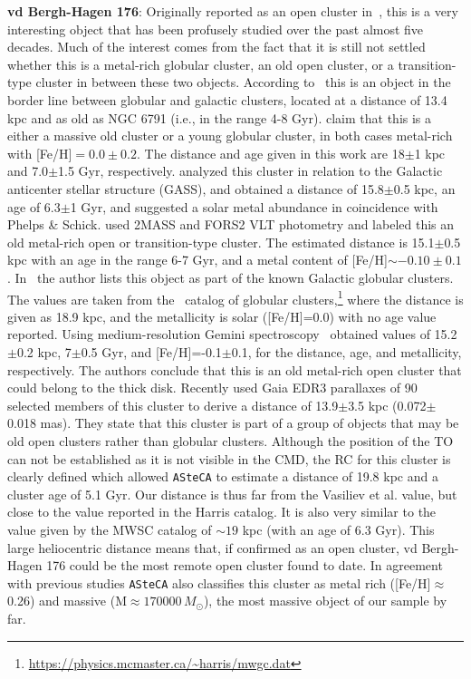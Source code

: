 \documentclass{aa}
\begin{document}
  \textbf{vd Bergh-Hagen 176}: Originally reported as an open cluster
  in~\cite{vandenBergh_1975}, this is a very interesting object that has been
  profusely studied over the past almost five decades. Much of the interest
  comes from the fact that it is still not settled whether this is a metal-rich
  globular cluster, an old open cluster, or a transition-type cluster in between
  these two objects.
  According to~\cite{Ortolani_1995} this is an object in the border line
  between globular and galactic clusters, located at a distance of 13.4 kpc
  and as old as NGC 6791 (i.e., in the range 4-8 Gyr).
  \cite{Phelps_2003} claim that this is a either a massive old cluster or a
  young globular cluster, in both cases metal-rich with [Fe/H]$=0.0\pm0.2$.
  The distance and age given in this work are 18$\pm$1 kpc and 7.0$\pm$1.5 Gyr,
  respectively.
  \cite{Frinchaboy_2006} analyzed this cluster in relation to the Galactic
  anticenter stellar structure (GASS), and obtained a distance of 15.8$\pm$0.5
  kpc, an age of 6.3$\pm$1 Gyr, and suggested a solar metal abundance in
  coincidence with Phelps \& Schick.
  \cite{Davoust_2011} used 2MASS and FORS2 VLT photometry and labeled this an
  old metal-rich open or transition-type cluster. The estimated  distance is
  15.1$\pm$0.5 kpc with an age in the range 6-7 Gyr, and a metal content of
  [Fe/H]$\sim-0.10\pm0.1$.
  In~\cite{vandenBergh_2011} the author lists this object as part of the known
  Galactic globular clusters. The values are taken from
  the~\cite{Harris_1996,Harris_2010} catalog of globular
  clusters,\footnote{\url{https://physics.mcmaster.ca/~harris/mwgc.dat}}
  where the distance is given as 18.9 kpc,
  and the metallicity is solar ([Fe/H]=0.0) with no age value reported.
  Using medium-resolution Gemini spectroscopy~\cite{Sharina_2014} obtained
  values of 15.2$\pm$0.2 kpc, 7$\pm$0.5 Gyr, and [Fe/H]=-0.1$\pm$0.1, for the
  distance, age, and metallicity, respectively. The authors conclude that this
  is an old metal-rich open cluster that could belong to the thick disk.
  Recently \cite{Vasiliev_2021} used Gaia EDR3 parallaxes of 90 selected
  members of this cluster to derive a distance of 13.9$\pm$3.5 kpc
  (0.072$\pm$0.018 mas). They state that this cluster is part of a group of
  objects that may be old open clusters rather than globular clusters.
  Although the position of the TO can not be established as it is not visible
  in the CMD, the RC for this cluster is clearly defined which allowed
  \texttt{ASteCA} to estimate a distance of 19.8 kpc and a cluster age of 5.1
  Gyr. Our distance is thus far from the Vasiliev et al. value, but close to the
  value reported in the Harris catalog. It is also very similar to the value
  given by the MWSC catalog of $\sim19$ kpc (with an age of 6.3 Gyr).
  This large heliocentric distance means that, if confirmed as an open
  cluster, vd Bergh-Hagen 176 could be the most remote open cluster found to
  date. In agreement with previous studies \texttt{ASteCA} also classifies this
  cluster as metal rich ([Fe/H]$\approx$0.26) and massive (M$\approx170000\,
  M_{\odot}$), the most massive object of our sample by far.\\
\end{document}
